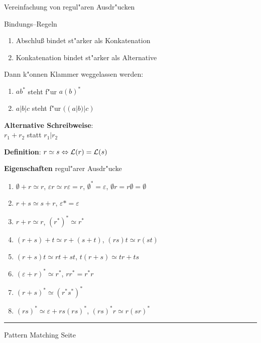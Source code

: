 
\begin{slide}{}
\normalsize

\begin{center}
Vereinfachung von regul"aren Ausdr"ucken
\end{center}
\vspace*{0.5cm}

\footnotesize

Bindungs--Regeln 
\begin{enumerate}
\item Abschlu{\ss} bindet st"arker als Konkatenation
\item Konkatenation bindet st"arker als Alternative
\end{enumerate}
Dann k"onnen Klammer weggelassen werden:
\begin{enumerate}
\item $ab^*$ \quad steht f"ur \quad $a(b)^*$
\item $a|b|c$ \quad steht f"ur \quad $((a|b)|c)$
\end{enumerate}
\textbf{Alternative Schreibweise}: \\[0.3cm]
\hspace*{1.3cm} $r_1 + r_2$ statt $r_1 | r_2$

\textbf{Definition}: $r \simeq s \Leftrightarrow {\cal L}(r) = {\cal L}(s)$

\textbf{Eigenschaften} regul"arer Ausdr"ucke
\begin{enumerate}
\item $\emptyset + r \simeq r$, \quad $\varepsilon r \simeq r \varepsilon = r$, \quad $\emptyset^* = \varepsilon$, \quad $\emptyset r = r\emptyset = \emptyset$
\item $r + s \simeq s + r$, \quad $\varepsilon* = \varepsilon$
\item $r + r \simeq r$, \quad $(r^*)^* \simeq r^*$
\item $(r + s) + t \simeq r + (s + t)$, \quad $(rs)t \simeq r(st)$
\item $(r+s)t \simeq rt + st$, \quad  $t(r+s) \simeq tr + ts$
\item $(\varepsilon + r)^* \simeq r^*$, \quad $rr^* = r^*r$
\item $(r + s)^* \simeq (r^*s^*)^*$
\item $(rs)^* \simeq \varepsilon + rs(rs)^*$, \quad $(rs)^*r \simeq r(sr)^*$
\end{enumerate}

\vspace*{\fill}
\tiny \addtocounter{mypage}{1}
\rule{17cm}{1mm}
Pattern Matching \hspace*{\fill} Seite 
\end{slide}

